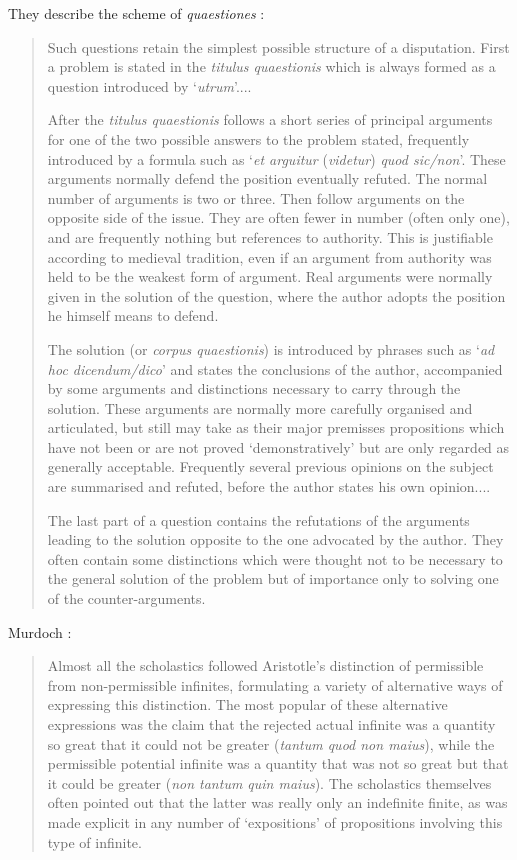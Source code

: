 \documentclass{amsart}
\theoremstyle{definition}
\begin{document}
 They describe the scheme of {\em quaestiones} \cite[pp.~30--32]{kenny}:
\begin{quote}
Such questions retain the simplest possible structure of a disputation. First a problem is stated in the {\em titulus quaestionis}
which is always formed as a question introduced by `{\em utrum}'....

After the {\em titulus quaestionis} follows a short series of principal arguments for one of the two possible
answers to the problem stated, frequently introduced by a formula such as `{\em et arguitur} ({\em videtur}) {\em quod sic/non}'.
These arguments normally defend the position eventually refuted. The normal number of arguments is two or three. Then follow
arguments on the opposite side of the issue. They are often fewer in number (often only one), and are frequently nothing
but references to authority. This is justifiable according to medieval tradition, even if an argument from authority was held to be
the weakest form of argument. Real arguments were normally given in the solution of the question, where the author
adopts the position he himself means to defend.

The solution (or {\em corpus quaestionis}) is introduced by phrases such as `{\em ad hoc dicendum/dico}' and states the conclusions of the
author, accompanied by some arguments and distinctions necessary to carry through the solution. These arguments are normally
more carefully organised and articulated, but still may take as their major premisses propositions which have not been or are not proved
`demonstratively' but are only regarded as generally acceptable. Frequently several previous opinions on the subject are
summarised and refuted, before the author states his own opinion....

The last part of a question contains the refutations of the arguments leading to the solution opposite to
the one advocated by the author. They often contain some distinctions which were thought not to be necessary to
the general solution of the problem but of importance only to solving one of the counter-arguments.
 \end{quote}


Murdoch \cite[pp.~567--568]{murdoch1982}:

\begin{quote}
Almost all the scholastics followed Aristotle's distinction of permissible from non-permissible infinites, formulating
a variety of alternative ways of expressing this distinction. The most popular of these alternative expressions
was the claim that the rejected actual infinite was a quantity so great that it could not be greater ({\em tantum quod non maius}),
while the permissible potential infinite was a quantity that was not so great but that it could be greater ({\em non tantum
quin maius}). The scholastics themselves often pointed out that the latter was really only an indefinite finite, as was made explicit
in any number of `expositions' of propositions involving this type of infinite.  
\end{quote}
\end{document}
